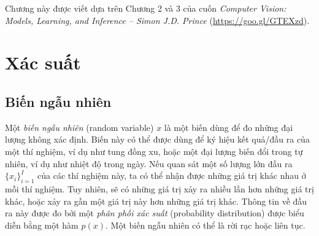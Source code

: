 {Chương này được viết dựa trên Chương 2 và 3 của cuốn \textit{Computer Vision:  Models, Learning, and Inference -- Simon J.D. Prince} (\url{https://goo.gl/GTEXzd}).}

\section{Xác suất}


\subsection{Biến ngẫu nhiên}

Một \textit{biến ngẫu nhiên} (random variable) $x$ là một biến dùng để đo những đại lượng không
xác định. Biến này có thể được dùng để ký hiệu kết quả/đầu ra của một thí
nghiệm, ví dụ như tung đồng xu, hoặc một đại lượng biến đổi trong tự nhiên, ví
dụ như nhiệt độ trong ngày. Nếu quan sát một số lượng lớn đầu ra
$\{x_i\}_{i=1}^I$ của các thí nghiệm này, ta có thể nhận được những giá trị khác
nhau ở mỗi thí nghiệm. Tuy nhiên, sẽ có những giá trị xảy ra nhiều lần hơn những
giá trị khác, hoặc xảy ra gần một giá trị này hơn những giá trị khác. Thông tin
về đầu ra này được đo bởi một \textit{phân phối xác suất} (probability distribution) được biểu diễn bằng
một hàm $p(x)$. Một biến ngẫu nhiên có thể là {rời rạc} hoặc {liên
tục}.

